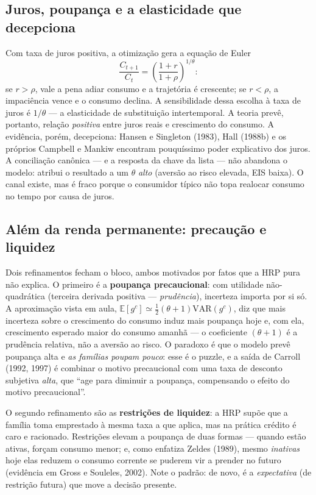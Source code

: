 \documentclass[12pt, a4paper]{article}
\newcommand{\E}{\mathbb{E}}
\newcommand{\VAR}{\mathrm{VAR}}
\begin{document}
\subsection{Juros, poupança e a elasticidade que decepciona}

Com taxa de juros positiva, a otimização gera a equação de Euler
\[
\frac{C_{t+1}}{C_t} = \left(\frac{1+r}{1+\rho}\right)^{1/\theta}:
\]
se $r > \rho$, vale a pena adiar consumo e a trajetória é crescente; se
$r<\rho$, a impaciência vence e o consumo declina. A sensibilidade dessa
escolha à taxa de juros é $1/\theta$ --- a elasticidade de substituição
intertemporal. A teoria prevê, portanto, relação \emph{positiva} entre juros
reais e crescimento do consumo. A evidência, porém, decepciona: Hansen e
Singleton (1983), Hall (1988b) e os próprios Campbell e Mankiw encontram
pouquíssimo poder explicativo dos juros. A conciliação canônica --- e a
resposta da chave da lista --- não abandona o modelo: atribui o resultado a um
$\theta$ \emph{alto} (aversão ao risco elevada, EIS baixa). O canal existe,
mas é fraco porque o consumidor típico não topa realocar consumo no tempo por
causa de juros.

\subsection{Além da renda permanente: precaução e liquidez}

Dois refinamentos fecham o bloco, ambos motivados por fatos que a HRP pura não
explica. O primeiro é a \textbf{poupança precaucional}: com utilidade
não-quadrática (terceira derivada positiva --- \emph{prudência}), incerteza
importa por si só. A aproximação vista em aula,
$\E[g^c] \simeq \tfrac{1}{2}(\theta+1)\VAR(g^c)$, diz que mais incerteza sobre
o crescimento do consumo induz mais poupança hoje e, com ela, crescimento
esperado maior do consumo amanhã --- o coeficiente $(\theta+1)$ é a prudência
relativa, não a aversão ao risco. O paradoxo é que o modelo prevê poupança
alta e \emph{as famílias poupam pouco}: esse é o puzzle, e a saída de Carroll
(1992, 1997) é combinar o motivo precaucional com uma taxa de desconto
subjetiva \emph{alta}, que ``age para diminuir a poupança, compensando o
efeito do motivo precaucional''.

O segundo refinamento são as \textbf{restrições de liquidez}: a HRP supõe que
a família toma emprestado à mesma taxa a que aplica, mas na prática crédito é
caro e racionado. Restrições elevam a poupança de duas formas --- quando estão
ativas, forçam consumo menor; e, como enfatiza Zeldes (1989), mesmo
\emph{inativas} hoje elas reduzem o consumo corrente se puderem vir a
prender no futuro (evidência em Gross e Souleles, 2002). Note o padrão: de
novo, é a \emph{expectativa} (de restrição futura) que move a decisão
presente.
\end{document}
